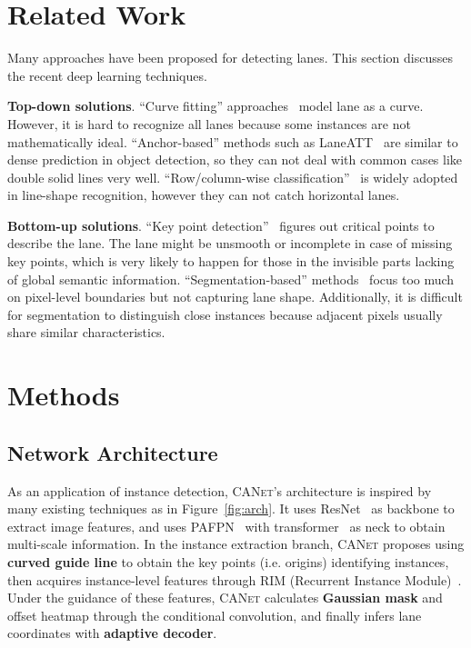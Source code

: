 \documentclass{article}
\newcommand\self{\textsc{CANet}\xspace}
\begin{document}
\section{Related Work}
\label{sec:related-work}

Many approaches have been proposed for detecting lanes. This section discusses
the recent deep learning techniques.

\textbf{Top-down solutions}. ``Curve fitting'' approaches~\cite{liu2021end, feng2022rethinking} model
lane as a curve. However, it is hard to recognize all lanes because some
instances are not mathematically ideal. ``Anchor-based'' methods such as
LaneATT~\cite{laneatt} are similar to dense prediction in object detection, so
they can not deal with common cases like double solid lines very well.
``Row/column-wise classification''~\cite{ultra_fast, condlanenet} is widely
adopted in line-shape recognition, however they can not catch horizontal lanes.

\textbf{Bottom-up solutions}. ``Key point detection''~\cite{folo, ganet} figures
out critical points to describe the lane. The lane might be unsmooth or
incomplete in case of missing key points, which is very likely to happen for
those in the invisible parts lacking of global semantic information.
``Segmentation-based'' methods~\cite{scnn, laneaf} focus too much on pixel-level
boundaries but not capturing lane shape. Additionally, it is difficult for
segmentation to distinguish close instances because adjacent pixels usually
share similar characteristics.


\section{Methods}
\label{sec:methods}



\subsection{Network Architecture}
\label{sec:network-architecture}

As an application of instance detection, \self's architecture is inspired by many existing techniques as in Figure~\ref{fig:arch}. 
It uses ResNet~\cite{resnet} as backbone to extract image features, and uses PAFPN~\cite{pafpn} with transformer~\cite{transformer} as neck to obtain multi-scale information. In the instance extraction branch, \self
proposes using \textbf{curved guide line} to obtain the key points (i.e. origins) identifying instances, 
then acquires instance-level features through RIM (Recurrent Instance Module)~\cite{condlanenet}. Under the guidance of these features, \self calculates \textbf{Gaussian mask} and offset heatmap through the conditional convolution, and finally infers lane coordinates with \textbf{adaptive decoder}.
\end{document}
